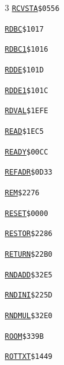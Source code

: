 \begin{multicols}{3}
\noindent\hyperlink{l:RCVSTA}{\texttt{RCVSTA}}\hfill\texttt{\$0556~\phantom{000}\llap{\pageref{l:RCVSTA}}}\par
\noindent\hyperlink{l:RDBC}{\texttt{RDBC}}\hfill\texttt{\$1017~\phantom{000}\llap{\pageref{l:RDBC}}}\par
\noindent\hyperlink{l:RDBC1}{\texttt{RDBC1}}\hfill\texttt{\$1016~\phantom{000}\llap{\pageref{l:RDBC1}}}\par
\noindent\hyperlink{l:RDDE}{\texttt{RDDE}}\hfill\texttt{\$101D~\phantom{000}\llap{\pageref{l:RDDE}}}\par
\noindent\hyperlink{l:RDDE1}{\texttt{RDDE1}}\hfill\texttt{\$101C~\phantom{000}\llap{\pageref{l:RDDE1}}}\par
\noindent\hyperlink{l:RDVAL}{\texttt{RDVAL}}\hfill\texttt{\$1EFE~\phantom{000}\llap{\pageref{l:RDVAL}}}\par
\noindent\hyperlink{l:READ}{\texttt{READ}}\hfill\texttt{\$1EC5~\phantom{000}\llap{\pageref{l:READ}}}\par
\noindent\hyperlink{l:READY}{\texttt{READY}}\hfill\texttt{\$00CC~\phantom{000}\llap{\pageref{l:READY}}}\par
\noindent\hyperlink{l:REFADR}{\texttt{REFADR}}\hfill\texttt{\$0D33~\phantom{000}\llap{\pageref{l:REFADR}}}\par
\noindent\hyperlink{l:REM}{\texttt{REM}}\hfill\texttt{\$2276~\phantom{000}\llap{\pageref{l:REM}}}\par
\noindent\hyperlink{l:RESET}{\texttt{RESET}}\hfill\texttt{\$0000~\phantom{000}\llap{\pageref{l:RESET}}}\par
\noindent\hyperlink{l:RESTOR}{\texttt{RESTOR}}\hfill\texttt{\$2286~\phantom{000}\llap{\pageref{l:RESTOR}}}\par
\noindent\hyperlink{l:RETURN}{\texttt{RETURN}}\hfill\texttt{\$22B0~\phantom{000}\llap{\pageref{l:RETURN}}}\par
\noindent\hyperlink{l:RNDADD}{\texttt{RNDADD}}\hfill\texttt{\$32E5~\phantom{000}\llap{\pageref{l:RNDADD}}}\par
\noindent\hyperlink{l:RNDINI}{\texttt{RNDINI}}\hfill\texttt{\$225D~\phantom{000}\llap{\pageref{l:RNDINI}}}\par
\noindent\hyperlink{l:RNDMUL}{\texttt{RNDMUL}}\hfill\texttt{\$32E0~\phantom{000}\llap{\pageref{l:RNDMUL}}}\par
\noindent\hyperlink{l:ROOM}{\texttt{ROOM}}\hfill\texttt{\$339B~\phantom{000}\llap{\pageref{l:ROOM}}}\par
\noindent\hyperlink{l:ROTTXT}{\texttt{ROTTXT}}\hfill\texttt{\$1449~\phantom{000}\llap{\pageref{l:ROTTXT}}}\par

\end{multicols}
